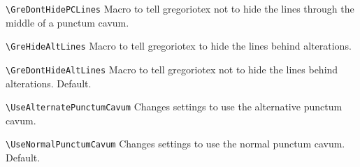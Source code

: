 \verb=\GreDontHidePCLines=%
	Macro to tell gregoriotex not to hide the lines through the middle of a punctum cavum.
	
\verb=\GreHideAltLines=%
	Macro to tell gregoriotex to hide the lines behind alterations.

\verb=\GreDontHideAltLines=%
	Macro to tell gregoriotex not to hide the lines behind alterations.  Default.

\verb=\UseAlternatePunctumCavum=%
	Changes settings to use the alternative punctum cavum.

\verb=\UseNormalPunctumCavum=%
	Changes settings to use the normal punctum cavum.  Default.

